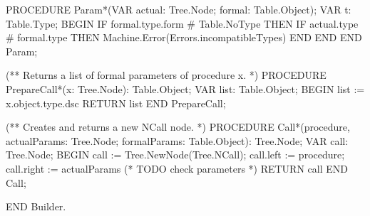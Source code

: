 \documentclass[utf8]{lgu}
\begin{document}
\begin{modula2long}
PROCEDURE Param*(VAR actual: Tree.Node; formal: Table.Object);
VAR t: Table.Type;
BEGIN
  IF formal.type.form # Table.NoType THEN
    IF actual.type # formal.type THEN
      Machine.Error(Errors.incompatibleTypes)
    END
  END
END Param;

(** Returns a list of formal parameters of procedure x. *)
PROCEDURE PrepareCall*(x: Tree.Node): Table.Object;
VAR list: Table.Object;
BEGIN
  list := x.object.type.dsc
RETURN list END PrepareCall;

(** Creates and returns a new NCall node. *)
PROCEDURE Call*(procedure, actualParams: Tree.Node;
  formalParams: Table.Object): Tree.Node;
VAR call: Tree.Node;
BEGIN
  call := Tree.NewNode(Tree.NCall);
  call.left := procedure;
  call.right := actualParams
  (* TODO check parameters *)
RETURN call END Call;

END Builder.
\end{modula2long}
\end{document}
